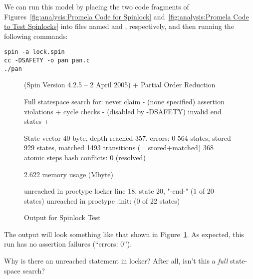 We can run this model by placing the two code fragments of
Figures~\ref{fig:analysis:Promela Code for Spinlock}
and~\ref{fig:analysis:Promela Code to Test Spinlocks} into
files named  and , respectively, and then running
the following commands:

\vspace{5pt}
\begin{minipage}[t]{\columnwidth}
\scriptsize
\begin{verbatim}
spin -a lock.spin
cc -DSAFETY -o pan pan.c
./pan
\end{verbatim}
\end{minipage}
\vspace{5pt}

\begin{figure}[htbp]
{ \scriptsize
\begin{verbbox}
(Spin Version 4.2.5 -- 2 April 2005)
        + Partial Order Reduction

Full statespace search for:
        never claim             - (none specified)
        assertion violations    +
        cycle checks            - (disabled by -DSAFETY)
        invalid end states      +

State-vector 40 byte, depth reached 357, errors: 0
     564 states, stored
     929 states, matched
    1493 transitions (= stored+matched)
     368 atomic steps
hash conflicts: 0 (resolved)

2.622   memory usage (Mbyte)

unreached in proctype locker
        line 18, state 20, "-end-"
        (1 of 20 states)
unreached in proctype :init:
        (0 of 22 states)
\end{verbbox}
}
\centering
\theverbbox
\caption{Output for Spinlock Test}
\label{fig:analysis:Output for Spinlock Test}
\end{figure}

The output will look something like that shown in
Figure~\ref{fig:analysis:Output for Spinlock Test}.
As expected, this run has no assertion failures (``errors: 0'').

\QuickQuiz{}
	Why is there an unreached statement in
	locker?  After all, isn't this a \emph{full} state-space
	search?
 \QuickQuizEnd

